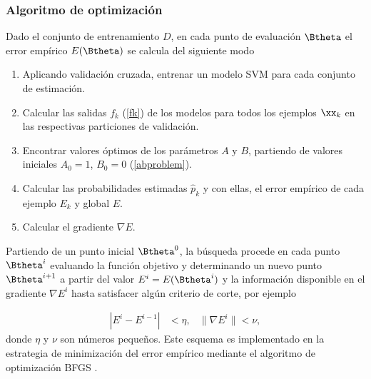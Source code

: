 \subsubsection{Algoritmo de optimización}
Dado el conjunto de entrenamiento $D$, en cada punto de evaluación
$\Btheta$ el error empírico $E(\Btheta)$ se calcula del siguiente modo

\begin{enumerate}
\item Aplicando validación cruzada, entrenar un modelo SVM para cada
  conjunto de estimación.
\item Calcular las salidas $f_k$ (\autoref{fk}) de los
  modelos para todos los ejemplos $\xx_k$ en las respectivas
  particiones de validación.
\item Encontrar valores óptimos de los parámetros $A$ y $B$, partiendo
  de valores iniciales $A_0=1$, $B_0=0$ (\autoref{abproblem}).
\item Calcular las probabilidades estimadas $\hat{p}_k$ y con ellas,
  el error empírico de cada ejemplo $E_k$ y global $E$.
\item Calcular el gradiente $\nabla{}E$.
\end{enumerate}
Partiendo de un punto inicial $\Btheta^0$, la búsqueda procede en cada
punto $\Btheta^i$ evaluando la función objetivo y determinando un
nuevo punto $\Btheta^{i+1}$ a partir del valor $E^i=E(\Btheta^i)$ y la
información disponible en el gradiente $\nabla{}E^i$ hasta satisfacer
algún criterio de corte, por ejemplo

\begin{align*}
  |E^i-E^{i-1}|&<\eta, & \|\nabla E^i\| < \nu,
\end{align*}
donde $\eta$ y $\nu$ son números pequeños.  Este esquema es
implementado en la estrategia de minimización del error empírico
mediante el algoritmo de optimización BFGS \cite{bfgs}.
